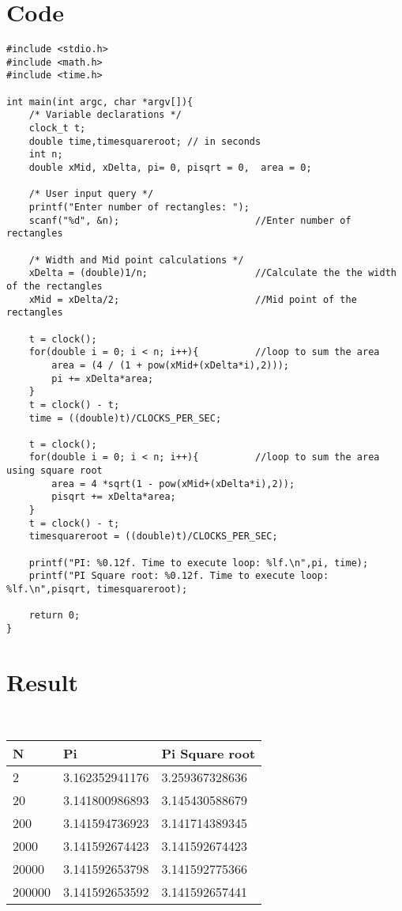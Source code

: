 \documentclass[12pt,letterpaper]{article}
\begin{document}
\section*{Code}\vspace{-15pt}
% 
\setlength{\leftmargin}{}%
\begin{adjustwidth}{-25pt}{100pt}
\begin{verbatim}
#include <stdio.h>
#include <math.h>
#include <time.h> 

int main(int argc, char *argv[]){
    /* Variable declarations */
    clock_t t;
    double time,timesquareroot; // in seconds
    int n;
    double xMid, xDelta, pi= 0, pisqrt = 0,  area = 0;
    
    /* User input query */
    printf("Enter number of rectangles: ");
    scanf("%d", &n);                        //Enter number of rectangles

    /* Width and Mid point calculations */
    xDelta = (double)1/n;                   //Calculate the the width of the rectangles
    xMid = xDelta/2;                        //Mid point of the rectangles

    t = clock(); 
    for(double i = 0; i < n; i++){          //loop to sum the area 
        area = (4 / (1 + pow(xMid+(xDelta*i),2))); 
        pi += xDelta*area;
    }
    t = clock() - t;
    time = ((double)t)/CLOCKS_PER_SEC;

    t = clock();
    for(double i = 0; i < n; i++){          //loop to sum the area using square root
        area = 4 *sqrt(1 - pow(xMid+(xDelta*i),2)); 
        pisqrt += xDelta*area;
    } 
    t = clock() - t;
    timesquareroot = ((double)t)/CLOCKS_PER_SEC;

    printf("PI: %0.12f. Time to execute loop: %lf.\n",pi, time);
    printf("PI Square root: %0.12f. Time to execute loop: %lf.\n",pisqrt, timesquareroot);

    return 0;
}
\end{verbatim}
\end{adjustwidth}

\section*{Result}\\
\begin{tabular}{|l|l|l|}
\hline
N      & Pi         & Pi Square root \\ \hline
2      & 3.162352941176   & 3.259367328636\\ \hline
20     & 3.141800986893   & 3.145430588679\\ \hline
200    & 3.141594736923   & 3.141714389345\\ \hline
2000   & 3.141592674423   & 3.141592674423\\ \hline
20000  & 3.141592653798   & 3.141592775366\\ \hline
200000 & 3.141592653592   & 3.141592657441\\ \hline
\end{tabular}
\end{document}

